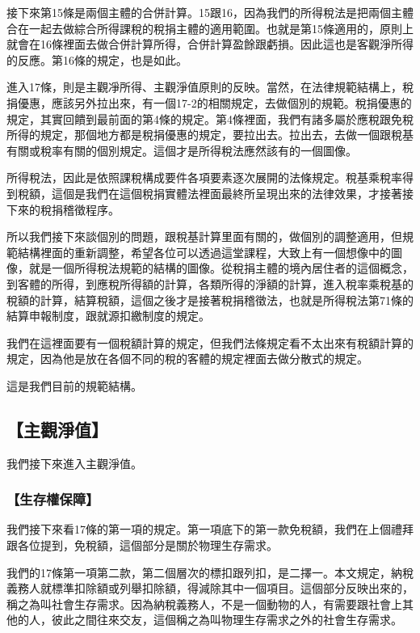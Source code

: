 \documentclass[oneside,sub3section]{ctexbook}
\begin{document}
接下來第15條是兩個主體的合併計算。15跟16，因為我們的所得稅法是把兩個主體合在一起去做綜合所得課稅的稅捐主體的適用範圍。也就是第15條適用的，原則上就會在16條裡面去做合併計算所得，合併計算盈餘跟虧損。因此這也是客觀淨所得的反應。第16條的規定，也是如此。

進入17條，則是主觀凈所得、主觀淨值原則的反映。當然，在法律規範結構上，稅捐優惠，應該另外拉出來，有一個17-2的相關規定，去做個別的規範。稅捐優惠的規定，其實回饋到最前面的第4條的規定。第4條裡面，我們有諸多屬於應稅跟免稅所得的規定，那個地方都是稅捐優惠的規定，要拉出去。拉出去，去做一個跟稅基有關或稅率有關的個別規定。這個才是所得稅法應然該有的一個圖像。

所得稅法，因此是依照課稅構成要件各項要素逐次展開的法條規定。稅基乘稅率得到稅額，這個是我們在這個稅捐實體法裡面最終所呈現出來的法律效果，才接著接下來的稅捐稽徵程序。

所以我們接下來談個別的問題，跟稅基計算里面有關的，做個別的調整適用，但規範結構裡面的重新調整，希望各位可以透過這堂課程，大致上有一個想像中的圖像，就是一個所得稅法規範的結構的圖像。從稅捐主體的境內居住者的這個概念，到客體的所得，到應稅所得額的計算，各類所得的淨額的計算，進入稅率乘稅基的稅額的計算，結算稅額，這個之後才是接著稅捐稽徵法，也就是所得稅法第71條的結算申報制度，跟就源扣繳制度的規定。

我們在這裡面要有一個稅額計算的規定，但我們法條規定看不太出來有稅額計算的規定，因為他是放在各個不同的稅的客體的規定裡面去做分散式的規定。

這是我們目前的規範結構。

\hypertarget{ux4e3bux89c0ux6de8ux503c}{%
\subsection{【主觀淨值】}\label{ux4e3bux89c0ux6de8ux503c}}

我們接下來進入主觀淨值。

\hypertarget{ux751fux5b58ux6b0aux4fddux969c}{%
\subsubsection{【生存權保障】}\label{ux751fux5b58ux6b0aux4fddux969c}}

我們接下來看17條的第一項的規定。第一項底下的第一款免稅額，我們在上個禮拜跟各位提到，免稅額，這個部分是關於物理生存需求。

我們的17條第一項第二款，第二個層次的標扣跟列扣，是二擇一。本文規定，納稅義務人就標準扣除額或列舉扣除額，得減除其中一個項目。這個部分反映出來的，稱之為叫社會生存需求。因為納稅義務人，不是一個動物的人，有需要跟社會上其他的人，彼此之間往來交友，這個稱之為叫物理生存需求之外的社會生存需求。
\end{document}
